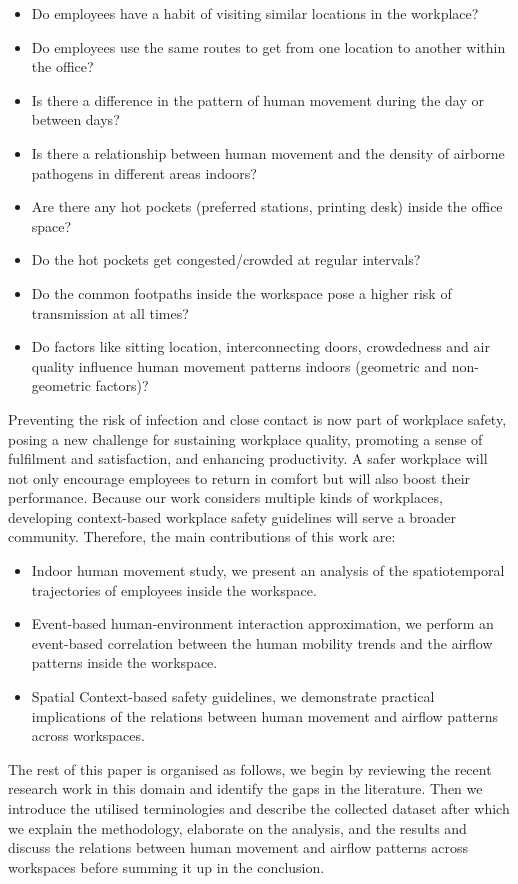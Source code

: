 \documentclass[acmtog]{acmart}
\begin{document}
\begin{itemize}
    \item Do employees have a habit of visiting similar locations in the workplace?
    \item Do employees use the same routes to get from one location to another within the office?
    \item Is there a difference in the pattern of human movement during the day or between days?
    \item Is there a relationship between human movement and the density of airborne pathogens in different areas indoors?
    \item Are there any hot pockets (preferred stations, printing desk) inside the office space?
    \item Do the hot pockets get congested/crowded at regular intervals?
    \item Do the common footpaths inside the workspace pose a higher risk of transmission at all times?
    \item Do factors like sitting location, interconnecting doors, crowdedness and air quality influence human movement patterns indoors (geometric and non-geometric factors)?
\end{itemize}



Preventing the risk of infection and close contact is now part of workplace safety, posing a new challenge for sustaining workplace quality, promoting a sense of fulfilment and satisfaction, and enhancing productivity. A safer workplace will not only encourage employees to return in comfort but will also boost their performance. Because our work considers multiple kinds of workplaces, developing context-based workplace safety guidelines will serve a broader community. Therefore, the main contributions of this work are:
\begin{itemize}
    \item Indoor human movement study, we present an analysis of the spatiotemporal trajectories of employees inside the workspace.
    \item Event-based human-environment interaction approximation, we perform an event-based correlation between the human mobility trends and the airflow patterns inside the workspace.
    \item Spatial Context-based safety guidelines, we demonstrate practical implications of the relations between human movement and airflow patterns across workspaces.
\end{itemize}
The rest of this paper is organised as follows, we begin by reviewing the recent research work in this domain and identify the gaps in the literature. Then we introduce the utilised terminologies and describe the collected dataset after which we explain the methodology, elaborate on the analysis, and the results and discuss the relations between human movement and airflow patterns across workspaces before summing it up in the conclusion.
\end{document}
